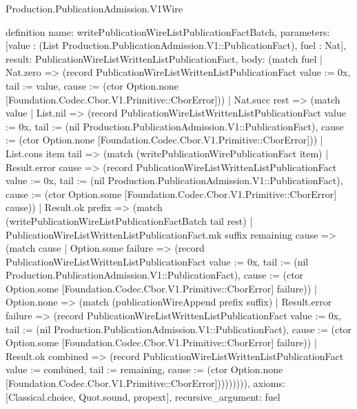 \begin{lexlean}{Production.PublicationAdmission.V1Wire}
\begin{semanticmodule}
definition{
  name: writePublicationWireListPublicationFactBatch,
  parameters: [value : (List Production.PublicationAdmission.V1::PublicationFact), fuel : Nat],
  result: PublicationWireListWrittenListPublicationFact,
  body: (match fuel
    | Nat.zero => (record PublicationWireListWrittenListPublicationFact {value := 0x, tail := value, cause := (ctor Option.none [Foundation.Codec.Cbor.V1.Primitive::CborError])})
    | Nat.succ rest => (match value
      | List.nil => (record PublicationWireListWrittenListPublicationFact {value := 0x, tail := (nil Production.PublicationAdmission.V1::PublicationFact), cause := (ctor Option.none [Foundation.Codec.Cbor.V1.Primitive::CborError])})
      | List.cons item tail => (match (writePublicationWirePublicationFact item)
        | Result.error cause => (record PublicationWireListWrittenListPublicationFact {value := 0x, tail := (nil Production.PublicationAdmission.V1::PublicationFact), cause := (ctor Option.some [Foundation.Codec.Cbor.V1.Primitive::CborError] cause)})
        | Result.ok prefix => (match (writePublicationWireListPublicationFactBatch tail rest)
          | PublicationWireListWrittenListPublicationFact.mk suffix remaining cause => (match cause
            | Option.some failure => (record PublicationWireListWrittenListPublicationFact {value := 0x, tail := (nil Production.PublicationAdmission.V1::PublicationFact), cause := (ctor Option.some [Foundation.Codec.Cbor.V1.Primitive::CborError] failure)})
            | Option.none => (match (publicationWireAppend prefix suffix)
              | Result.error failure => (record PublicationWireListWrittenListPublicationFact {value := 0x, tail := (nil Production.PublicationAdmission.V1::PublicationFact), cause := (ctor Option.some [Foundation.Codec.Cbor.V1.Primitive::CborError] failure)})
              | Result.ok combined => (record PublicationWireListWrittenListPublicationFact {value := combined, tail := remaining, cause := (ctor Option.none [Foundation.Codec.Cbor.V1.Primitive::CborError])}))))))),
  axioms: [Classical.choice, Quot.sound, propext],
  recursive_argument: fuel
}


\end{semanticmodule}
\end{lexlean}
